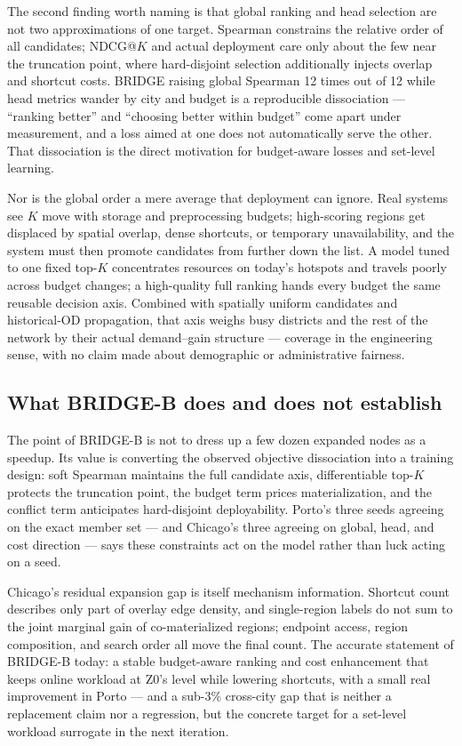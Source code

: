 \documentclass[5p,twocolumn,authoryear]{elsarticle}
\newcommand{\zmethod}{Z0}
\newcommand{\gmethod}{BRIDGE}
\newcommand{\bmethod}{BRIDGE-B}
\begin{document}
The second finding worth naming is that global ranking and head selection are not two
approximations of one target. Spearman constrains the relative order of all candidates;
NDCG@$K$ and actual deployment care only about the few near the truncation point, where
hard-disjoint selection additionally injects overlap and shortcut costs. \gmethod{}
raising global Spearman 12 times out of 12 while head metrics wander by city and budget is
a reproducible dissociation --- ``ranking better'' and ``choosing better within budget''
come apart under measurement, and a loss aimed at one does not automatically serve the
other. That dissociation is the direct motivation for budget-aware losses and set-level
learning.

Nor is the global order a mere average that deployment can ignore. Real systems see $K$
move with storage and preprocessing budgets; high-scoring regions get displaced by spatial
overlap, dense shortcuts, or temporary unavailability, and the system must then promote
candidates from further down the list. A model tuned to one fixed top-$K$ concentrates
resources on today's hotspots and travels poorly across budget changes; a high-quality full
ranking hands every budget the same reusable decision axis. Combined with spatially uniform
candidates and historical-OD propagation, that axis weighs busy districts and the rest of
the network by their actual demand--gain structure --- coverage in the engineering sense,
with no claim made about demographic or administrative fairness.

\subsection{What \bmethod{} does and does not establish}

The point of \bmethod{} is not to dress up a few dozen expanded nodes as a speedup. Its
value is converting the observed objective dissociation into a training design: soft
Spearman maintains the full candidate axis, differentiable top-$K$ protects the truncation
point, the budget term prices materialization, and the conflict term anticipates
hard-disjoint deployability. Porto's three seeds agreeing on the exact member set --- and
Chicago's three agreeing on global, head, and cost direction --- says these constraints act
on the model rather than luck acting on a seed.

Chicago's residual expansion gap is itself mechanism information. Shortcut count describes
only part of overlay edge density, and single-region labels do not sum to the joint
marginal gain of co-materialized regions; endpoint access, region composition, and search
order all move the final count. The accurate statement of \bmethod{} today: a stable
budget-aware ranking and cost enhancement that keeps online workload at \zmethod's level
while lowering shortcuts, with a small real improvement in Porto --- and a sub-3\%
cross-city gap that is neither a replacement claim nor a regression, but the concrete
target for a set-level workload surrogate in the next iteration.
\end{document}
